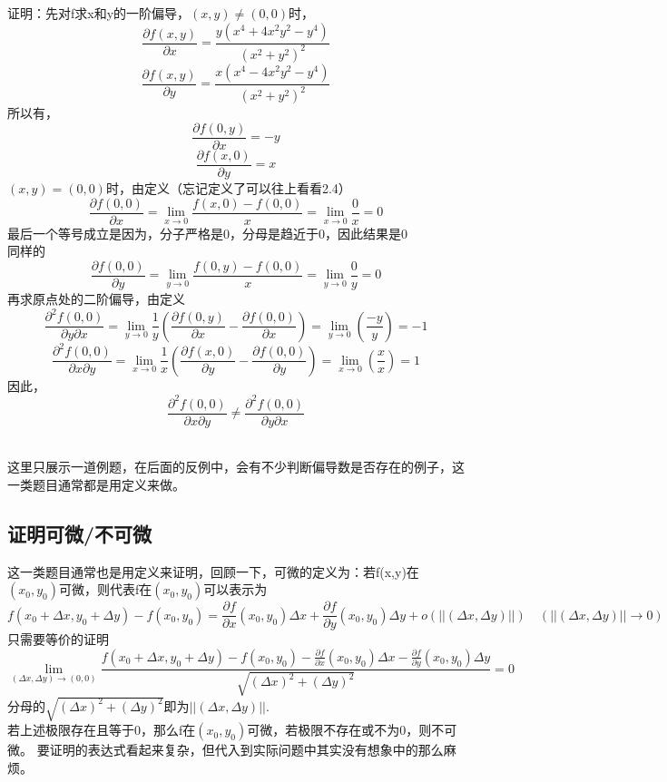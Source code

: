 \documentclass{article}
\begin{document}
证明：先对f求x和y的一阶偏导，$(x,y) \neq (0,0)$时，
\[\frac{\partial f(x,y)}{\partial x}= \frac{y(x^4+4x^2y^2-y^4)}{(x^2+y^2)^2}\]
\[\frac{\partial f(x,y)}{\partial y}= \frac{x(x^4-4x^2y^2-y^4)}{(x^2+y^2)^2}\]
所以有，
\[\frac{\partial f(0,y)}{\partial x}= -y\]
\[\frac{\partial f(x,0)}{\partial y}= x\]
$(x,y) = (0,0)$时，由定义（忘记定义了可以往上看看2.4）
\[\frac{\partial f(0,0)}{\partial x}=  \lim\limits_{x \rightarrow 0} \frac{f(x,0)-f(0,0)}{x} = \lim\limits_{x \rightarrow 0} \frac{0}{x}=0\]
最后一个等号成立是因为，分子严格是0，分母是趋近于0，因此结果是0 \\
同样的
\[\frac{\partial f(0,0)}{\partial y}=  \lim\limits_{y \rightarrow 0} \frac{f(0,y)-f(0,0)}{x} = \lim\limits_{y \rightarrow 0} \frac{0}{y}=0\]
再求原点处的二阶偏导，由定义
\[\frac{\partial^2 f(0,0)}{\partial y \partial x} = \lim\limits_{y \rightarrow 0} \frac{1}{y}\left( \frac{\partial f(0,y)}{\partial x}-\frac{\partial f(0,0)}{\partial x} \right)
= \lim\limits_{y \rightarrow 0}\left(  \frac{-y}{y}  \right)
=-1\]
\[\frac{\partial^2 f(0,0)}{\partial x \partial y} = \lim\limits_{x \rightarrow 0} \frac{1}{x}\left( \frac{\partial f(x,0)}{\partial y}-\frac{\partial f(0,0)}{\partial y} \right)
= \lim\limits_{x \rightarrow 0}\left(  \frac{x}{x}  \right)
=1\]
因此，
\[\frac{\partial^2 f(0,0)}{\partial x \partial y}  \neq \frac{\partial^2 f(0,0)}{\partial y \partial x}\]

~\\

这里只展示一道例题，在后面的反例中，会有不少判断偏导数是否存在的例子，这一类题目通常都是用定义来做。

\subsection{证明可微/不可微}
这一类题目通常也是用定义来证明，回顾一下，可微的定义为：若f(x,y)在$(x_0,y_0)$可微，则代表f在$(x_0,y_0)$可以表示为
\[f(x_0+\Delta x,y_0+\Delta y)-f(x_0,y_0)= \frac{\partial f}{\partial x}(x_0,y_0)\Delta x+\frac{\partial f}{\partial y}(x_0,y_0)\Delta y+o(||(\Delta x,\Delta y)||) \quad (||(\Delta x,\Delta y)|| \rightarrow 0)\]
只需要等价的证明
\[\lim\limits_{(\Delta x,\Delta y) \rightarrow (0,0)} \frac{ f(x_0+\Delta x,y_0+\Delta y)-f(x_0,y_0) - \frac{\partial f}{\partial x}(x_0,y_0)\Delta x - \frac{\partial f}{\partial y}(x_0,y_0)\Delta y}{ \sqrt{(\Delta x)^2+(\Delta y)^2} } = 0\]
分母的$\sqrt{(\Delta x)^2+(\Delta y)^2}$即为$||(\Delta x,\Delta y)||$.\\
若上述极限存在且等于0，那么f在$(x_0,y_0)$可微，若极限不存在或不为0，则不可微。
要证明的表达式看起来复杂，但代入到实际问题中其实没有想象中的那么麻烦。
\end{document}
